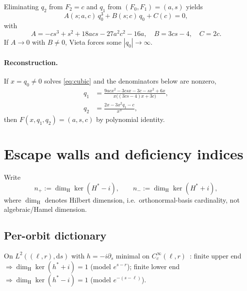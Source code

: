 ﻿\documentclass[11pt]{article}
\begin{document}
Eliminating \(q_2\) from \(F_2=c\) and \(q_1\) from \((F_0,F_1)=(a,s)\) yields
\begingroup
\renewcommand*{\theHequation}{cubic}
\begin{equation}
A(s;a,c)\,q_0^3+B(s;c)\,q_0+C(c)=0,
\tag{7.2}
\label{eq:cubic}
\end{equation}
\endgroup
with
\[
A=-cs^3+s^2+18acs-27a^2c^2-16a,\quad
B=3cs-4,\quad
C=2c.
\]
If \(A\to 0\) with \(B\neq 0\), Vieta forces some \(|q_0|\to\infty\).

\paragraph{Reconstruction.}
If \(x=q_0\neq 0\) solves \eqref{eq:cubic} and the denominators below are nonzero,
\begingroup
\renewcommand*{\theHequation}{reconstruction}
\begin{equation}
\begin{aligned}
q_1
&=\frac{9acx^2-3csx-3c-sx^2+6x}{x\bigl((3cs-4)x+3c\bigr)},\\
q_2
&=\frac{2x-3x^2q_1-c}{x^3},
\end{aligned}
\tag{8.0}
\label{eq:recon}
\end{equation}
\endgroup
then \(F(x,q_1,q_2)=(a,s,c)\) by polynomial identity.

\section{Escape walls and deficiency indices}
Write
\[
n_+:=\dim_{\mathrm H}\ker(H^*-i),\qquad
n_-:=\dim_{\mathrm H}\ker(H^*+i),
\]
where \(\dim_{\mathrm H}\) denotes Hilbert dimension, i.e.\ orthonormal-basis
cardinality, not algebraic/Hamel dimension.

\subsection{Per-orbit dictionary}
On \(L^2((\ell,r),\mathrm{d}s)\) with \(h=-i\partial_s\) minimal on \(C_c^\infty(\ell,r)\)~\cite{RS2}:
finite upper end \(\Rightarrow\dim_{\mathrm H}\ker(h^*+i)=1\) (model \(e^{s-r}\));
finite lower end \(\Rightarrow\dim_{\mathrm H}\ker(h^*-i)=1\) (model \(e^{-(s-\ell)}\)).
\end{document}

